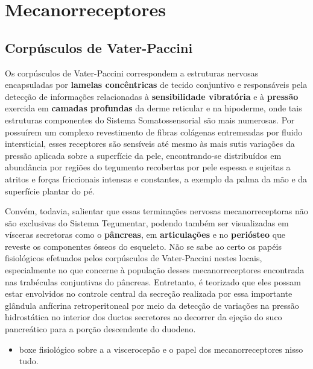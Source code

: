 \documentclass[
]{book}
\providecommand{\tightlist}{%
  \setlength{\itemsep}{0pt}\setlength{\parskip}{0pt}}
\theoremstyle{definition}
\theoremstyle{definition}
\theoremstyle{definition}
\theoremstyle{definition}
\theoremstyle{remark}
\begin{document}
\hypertarget{mecanorreceptores}{%
\chapter{Mecanorreceptores}\label{mecanorreceptores}}

\hypertarget{corpuxfasculos-de-vater-paccini}{%
\section{Corpúsculos de Vater-Paccini}\label{corpuxfasculos-de-vater-paccini}}

Os corpúsculos de Vater-Paccini correspondem a estruturas nervosas encapsuladas por \textbf{lamelas concêntricas} de tecido conjuntivo e responsáveis pela detecção de informações relacionadas à \textbf{sensibilidade vibratória} e à \textbf{pressão} exercida em \textbf{camadas profundas} da derme reticular e na hipoderme, onde tais estruturas componentes do Sistema Somatossensorial são mais numerosas. Por possuírem um complexo revestimento de fibras colágenas entremeadas por fluido intersticial, esses receptores são sensíveis até mesmo às mais sutis variações da pressão aplicada sobre a superfície da pele, encontrando-se distribuídos em abundância por regiões do tegumento recobertas por pele espessa e sujeitas a atritos e forças friccionais intensas e constantes, a exemplo da palma da mão e da superfície plantar do pé.

Convém, todavia, salientar que essas terminações nervosas mecanorreceptoras não são exclusivas do Sistema Tegumentar, podendo também ser visualizadas em vísceras secretoras como o \textbf{pâncreas}, em \textbf{articulações} e no \textbf{periósteo} que reveste os componentes ósseos do esqueleto. Não se sabe ao certo os papéis fisiológicos efetuados pelos corpúsculos de Vater-Paccini nestes locais, especialmente no que concerne à população desses mecanorreceptores encontrada nas trabéculas conjuntivas do pâncreas. Entretanto, é teorizado que eles possam estar envolvidos no controle central da secreção realizada por essa importante glândula anfícrina retroperitoneal por meio da detecção de variações na pressão hidrostática no interior dos ductos secretores ao decorrer da ejeção do suco pancreático para a porção descendente do duodeno.

\begin{itemize}
\tightlist
\item
  boxe fisiológico sobre a a viscerocepão e o papel dos mecanorreceptores nisso tudo.
\end{itemize}
\end{document}
